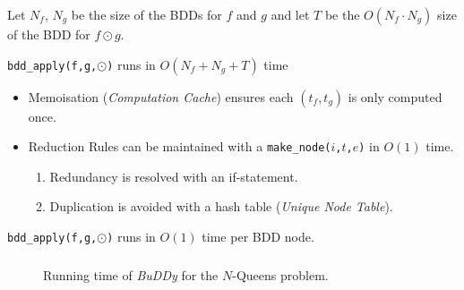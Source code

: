 \documentclass[english, aspectratio=169]{beamer}
\begin{document}
\begin{frame}
  \frametitle{\secname}

  Let $N_f$, $N_g$ be the size of the BDDs for $f$ and $g$ and let $T$ be the $O(N_f \cdot N_g)$
  size of the BDD for $f \odot g$.

  \begin{theorem}
    \lstinline{bdd_apply(f,g,}$\odot$\lstinline{)} runs in $O(N_f + N_g + T)$
    time
  \end{theorem}
  \begin{itemize}
  \item Memoisation (\emph{Computation Cache}) ensures each $(t_f,t_g)$ is
    only computed once.

  \item Reduction Rules can be maintained with a
    \texttt{make\_node($i$,$t$,$e$)} in $O(1)$ time.
    \begin{enumerate}
    \item Redundancy is resolved with an if-statement.
    \item Duplication is avoided with a hash table (\emph{Unique Node Table}).
    \end{enumerate}
  \end{itemize}

  \begin{corollary}
    \lstinline{bdd_apply(f,g,}$\odot$\lstinline{)} runs in $O(1)$ time per BDD node.
  \end{corollary}
\end{frame}

\begin{frame}
  \frametitle{\secname}

  \begin{figure}
    \centering


    \caption{Running time of \emph{BuDDy} for the $N$-Queens problem.}
  \end{figure}
\end{frame}
\end{document}
